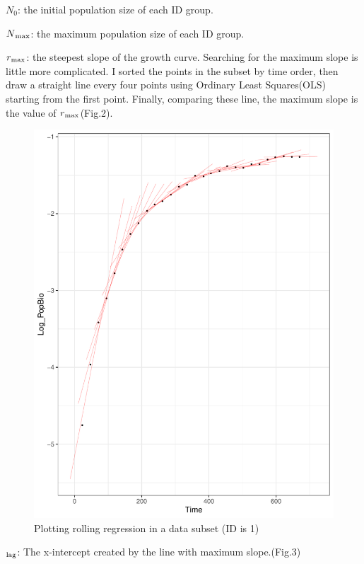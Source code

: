 \documentclass[11pt]{article}
\begin{document}
    $N_0$: the initial population size of each ID group.
    
    $N\textsubscript{max}$: the maximum population size of each ID group.
    
    $r\textsubscript{max}$: the steepest slope of the growth curve. Searching for the maximum slope is little more complicated. I sorted the points in the subset by time order, then draw a straight line every four points using Ordinary Least Squares(OLS) starting from the first point. Finally, comparing these line, the maximum slope is the value of $r\textsubscript{max}$(Fig.2).
    
    \begin{figure}[H]
            \centering
			\includegraphics[width = \textwidth]{../results/images/find_rmax_sample1.pdf}
            \caption{Plotting rolling regression in a data subset (ID is 1) }
            \label{fig2}
    \end{figure}
    
    $\textsubscript{lag}$: The x-intercept created by the line with maximum slope.(Fig.3)
    
\end{document}
